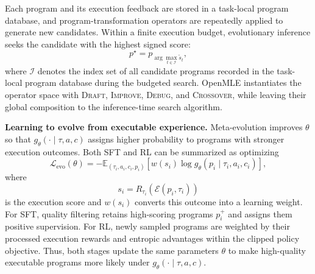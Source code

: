Each program and its execution feedback are stored in a task-local
program database, and program-transformation operators are repeatedly
applied to generate new candidates.
Within a finite execution budget, evolutionary inference seeks the
candidate with the highest signed score:
\[
p^\star
=
p_{\arg\max_{t\in\mathcal{I}}\tilde{s}_t},
\]
where $\mathcal{I}$ denotes the index set of all candidate programs
recorded in the task-local program database during the budgeted search.
OpenMLE instantiates the operator space with \textsc{Draft},
\textsc{Improve}, \textsc{Debug}, and \textsc{Crossover}, while leaving
their global composition to the inference-time search algorithm.

\textbf{Learning to evolve from executable experience.}
Meta-evolution improves $\theta$ so that
$g_\theta(\cdot\mid\tau,a,c)$ assigns higher probability to programs
with stronger execution outcomes.
Both SFT and RL can be summarized as optimizing
\[
\mathcal{L}_{\mathrm{evo}}(\theta)
=
-
\mathbb{E}_{(\tau_i,a_i,c_i,p_i)}
\left[
w(s_i)
\log g_\theta
\left(
p_i\mid\tau_i,a_i,c_i
\right)
\right],
\]
where
\[
s_i=R_{\tau_i}\!\left(\mathcal{E}(p_i,\tau_i)\right)
\]
is the execution score and $w(s_i)$ converts this outcome into a
learning weight.
For SFT, quality filtering retains high-scoring programs $p_i^+$ and
assigns them positive supervision.
For RL, newly sampled programs are weighted by their processed
execution rewards and entropic advantages within the clipped policy
objective.
Thus, both stages update the same parameters $\theta$ to make
high-quality executable programs more likely under
$g_\theta(\cdot\mid\tau,a,c)$.
